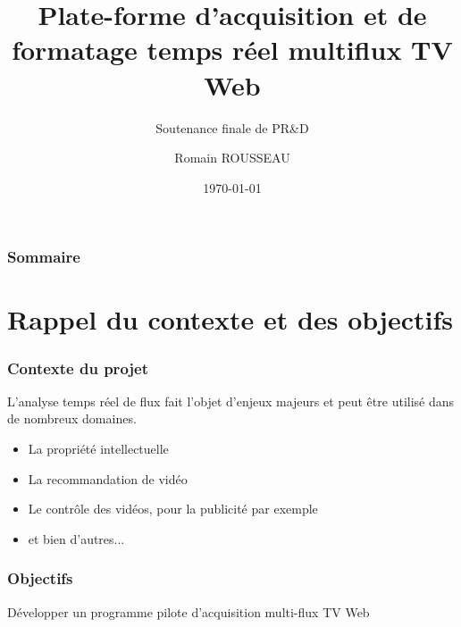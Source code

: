 \documentclass{beamer}
\begin{document}
\AtBeginSection[]{
	
	\begin{frame}
	
	\tableofcontents[currentsection]
	
	\end{frame} 

}

\title[Plate-forme d'acquisition multiflux TV Web]{Plate-forme d'acquisition et de formatage temps réel multiflux TV Web}
\subtitle{Soutenance finale de PR\&D}
\author{Romain ROUSSEAU}
\date{\today}

\begin{frame}[plain]
	\maketitle
\end{frame}

\begin{frame}

\frametitle{Sommaire}

\tableofcontents


\end{frame}




\section[Contexte et objectifs]{Rappel du contexte et des objectifs}

\begin{frame}
\frametitle{Contexte du projet}

L'analyse temps réel de flux fait l'objet d'enjeux majeurs et peut être utilisé dans de nombreux domaines.

\begin{itemize}
	\item La propriété intellectuelle
	\item La recommandation de vidéo
	\item Le contrôle des vidéos, pour la publicité par exemple
	\item et bien d'autres...
\end{itemize}

\end{frame}

\begin{frame}
\frametitle{Objectifs}

Développer un programme pilote d'acquisition multi-flux TV Web 

\end{frame}
\end{document}

